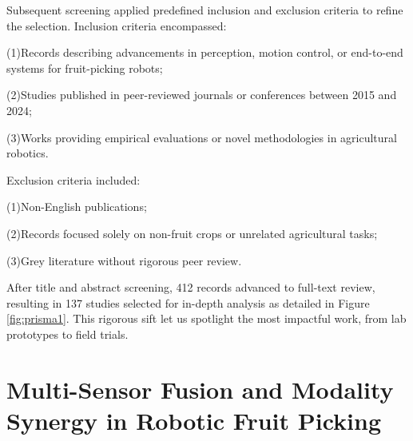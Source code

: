 \documentclass[a4paper,fleqn]{cas-dc}
\begin{document}
Subsequent screening applied predefined inclusion and exclusion criteria to refine the selection. Inclusion criteria encompassed:

(1)Records describing advancements in perception, motion control, or end-to-end systems for fruit-picking robots;

(2)Studies published in peer-reviewed journals or conferences between 2015 and 2024;

(3)Works providing empirical evaluations or novel methodologies in agricultural robotics.

Exclusion criteria included:

(1)Non-English publications;

(2)Records focused solely on non-fruit crops or unrelated agricultural tasks;

(3)Grey literature without rigorous peer review.

After title and abstract screening, 412 records advanced to full-text review, resulting in 137 studies selected for in-depth analysis as detailed in Figure \ref{fig:prisma1}. This rigorous sift let us spotlight the most impactful work, from lab prototypes to field trials. 



\section{Multi-Sensor Fusion and Modality Synergy in Robotic Fruit Picking}
\end{document}
